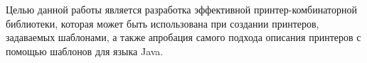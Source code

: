 
Целью данной работы является разработка эффективной принтер-комбинаторной
библиотеки, которая может быть использована при создании принтеров, задаваемых
шаблонами, а также апробация самого подхода описания принтеров с помощью
шаблонов для языка Java.
